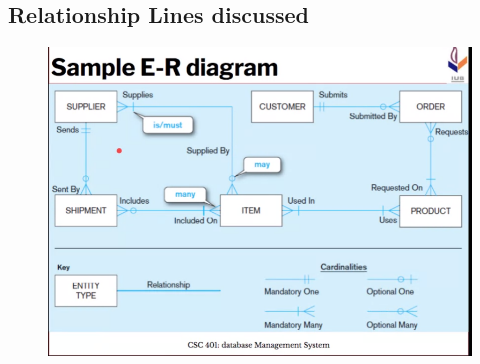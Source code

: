 \documentclass{article}
\begin{document}
        \subsection{Relationship Lines discussed}
            \begin{figure}[h]
                \centerline{
                    \includegraphics[scale=0.4]{Sample ERD.png}
                }
            \end{figure}
\end{document}
